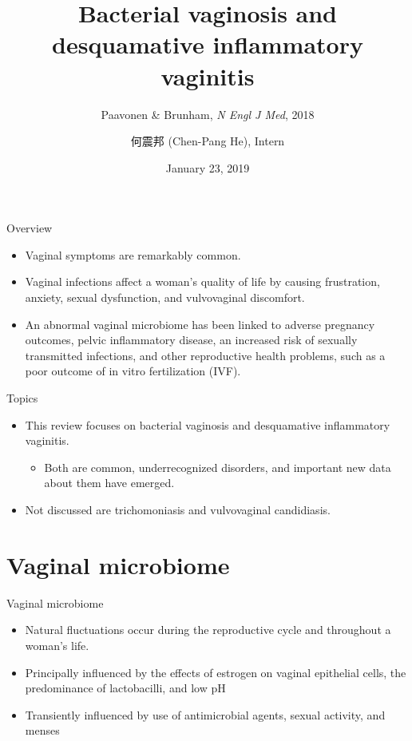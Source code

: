 \documentclass{beamer}
\title[Vaginitis]{Bacterial vaginosis and desquamative inflammatory vaginitis}
\subtitle{Paavonen \& Brunham, \textit{N Engl J Med}, 2018}
\author[Chen-Pang He]{何震邦 (Chen-Pang He), Intern}
\date{January 23, 2019}
\institute[CGH]{Cathay General Hospital}
\begin{document}
\maketitle

\begin{frame}{Overview}
    \begin{itemize}
        \item Vaginal symptoms are remarkably common.
        \item Vaginal infections affect a woman's quality of life by causing
              frustration, anxiety, sexual dysfunction, and vulvovaginal
              discomfort.
        \item An abnormal vaginal microbiome has been linked to adverse
              pregnancy outcomes, pelvic inflammatory disease, an increased
              risk of sexually transmitted infections, and other reproductive
              health problems, such as a poor outcome of in vitro fertilization
              (IVF).
    \end{itemize}
\end{frame}

\begin{frame}{Topics}
    \begin{itemize}
        \item This review focuses on bacterial vaginosis and desquamative inflammatory vaginitis.
            \begin{itemize}
                \item Both are common, underrecognized disorders, and important new data about them have emerged.
            \end{itemize}
        \item Not discussed are trichomoniasis and vulvovaginal candidiasis.
    \end{itemize}
\end{frame}

\section{Vaginal microbiome}
\begin{frame}{Vaginal microbiome}
    \begin{itemize}
        \item Natural fluctuations occur during the reproductive cycle and
              throughout a woman's life.
        \item Principally influenced by the effects of estrogen on vaginal
              epithelial cells, the predominance of lactobacilli, and low pH
        \item Transiently influenced by use of antimicrobial agents, sexual
              activity, and menses
    \end{itemize}
\end{frame}
\end{document}
